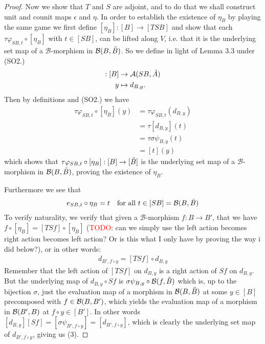 \documentclass[12pt,a4paper]{article}
\def\HomA{\ensuremath\mathcal{A}}
\def\HomB{\ensuremath\mathcal{B}}
\def\t{\ensuremath\tilde}
\begin{document}
\begin{proof}
	Now we show that $T$ and $S$ are adjoint, and to do that we shall construct  unit and counit maps $\epsilon$ and $\eta$. In order to establish the existence of $\eta_B$ by playing the same game we first define $[\eta_B]: [B] \to [TSB]$ and show that each $\tau \varphi_{SB, t} \circ [\eta_B]$ with $t \in [SB]$, can be lifted along $V$, i.e. that it is the underlying set map of a $\mathcal{B}$-morphism in $\HomB(B, \t B)$. So we define in light of Lemma 3.3 under (SO2.)
	\begin{align*}
		[\eta_B]:[B] &\to \HomA(SB, \t A)\\
		y &\mapsto d_{B,y}.
	\end{align*}
Then by definitions and (SO2.) we have  \begin{align*}
	\tau \varphi_{SB, t} \circ [\eta_B](y) &= \tau \varphi_{SB, t} (d_{B,y})\\ &= \tau [d_{B,y}](t)\\ &= \tau \sigma \psi_{B,y}(t)\\ &= [t](y)
\end{align*}
which shows that $\tau \varphi_{SB, t} \circ [\eta_B]: [B] \to [\t B]$ is the underlying set map of a $\mathcal{B}$-morphism in $\HomB(B, \t B)$, proving the existence of $\eta_B$. 

Furthermore we see that \begin{align}
	e_{SB, t} \circ \eta_B = t \ \ \text{ for all } t \in [SB]= \HomB(B, \t B)
\end{align}
To verify naturality, we verify that given a $\mathcal{B}$-morphism $f: B \to B'$, that we have $f \circ [\eta_B] = [TSf] \circ [\eta_B]$ (\textcolor{red}{TODO}: can we simply use the left action becomes right action becomes left action? Or is this what I only have by proving the way i did below?), or in other words: \begin{align}
	d_{B', f \circ y} = [TSf] \circ d_{B,y}
\end{align} 
Remember that the left action of $[TSf]$ on $d_{B,y}$ is a right action of $Sf$ on $d_{B,y}$. But the underlying map of $d_{B,y} \circ Sf$ is $\sigma \psi_{B,y} \circ \HomB(f, \t B)$ which is, up to the bijection $\sigma$, just the evaluation map of a morphism in $\HomB(B, \t B)$ at some $y \in [B]$ precomposed with $f \in \HomB(B, B')$, which yields the evaluation map of a morphism in $\HomB(B',B)$ at $f \circ y \in [B']$. In other words $[d_{B,y}] [Sf] = [\sigma \psi_{B', f \circ y}] = [d_{B', f \circ y}]$, which is clearly the underlying set map of $d_{B', f \circ y}$, giving us (3). 




\end{proof}
\end{document}
